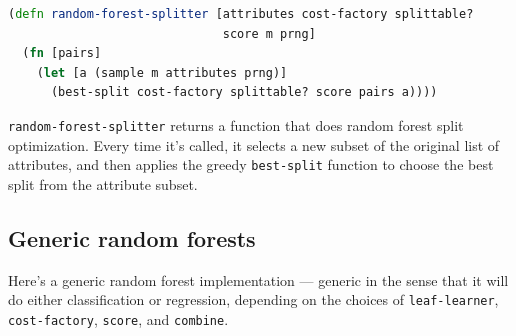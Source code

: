 \documentclass[10pt,openany]{article}
\numberwithin{definition}{section}
\numberwithin{example}{section}
\numberwithin{equation}{section}
\numberwithin{figure}{section}
\begin{document}
\begin{minipage}[t]{1\columnwidth}%
\begin{lstlisting}[caption={Random forest split optimizer},label={lis:random-forest-splits},language=clojure,tabsize=2]
(defn random-forest-splitter [attributes cost-factory splittable? 
                              score m prng]
  (fn [pairs]
    (let [a (sample m attributes prng)]
      (best-split cost-factory splittable? score pairs a)))) 
\end{lstlisting}
%
\end{minipage}

\texttt{random-forest-splitter} returns a function that does random
forest split optimization. Every time it's called, it selects a new
subset of the original list of attributes, and then applies the greedy
\texttt{best-split} function to choose the best split from the attribute
subset.


\subsection{Generic random forests}

Here's a generic random forest implementation --- generic in the sense
that it will do either classification or regression, depending on
the choices of \texttt{leaf-learner}, \texttt{cost-factory}, \texttt{score},
and \texttt{combine}.
\end{document}
